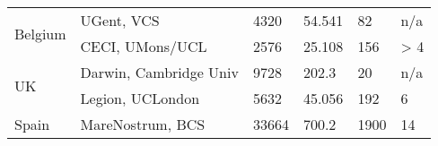 \begin{tabular}{|l|l||l|l|l|l|}
  \hline\hline
  \multirow{2}{*}{Belgium} & UGent, VCS           & 4320        & 54.541       & 82                & n/a \\
                       &     CECI, UMons/UCL      & 2576        & 25.108       & 156               & > 4  \\
  \hline\hline
  \multirow{2}{*}{UK}  & Darwin, Cambridge Univ   & 9728        & 202.3        & 20                & n/a \\
                       &     Legion, UCLondon     & 5632        & 45.056       & 192               & 6  \\
  \hline\hline
  Spain                & MareNostrum, BCS         & 33664       & 700.2        & 1900              & 14  \\
  \hline
\end{tabular}



%
